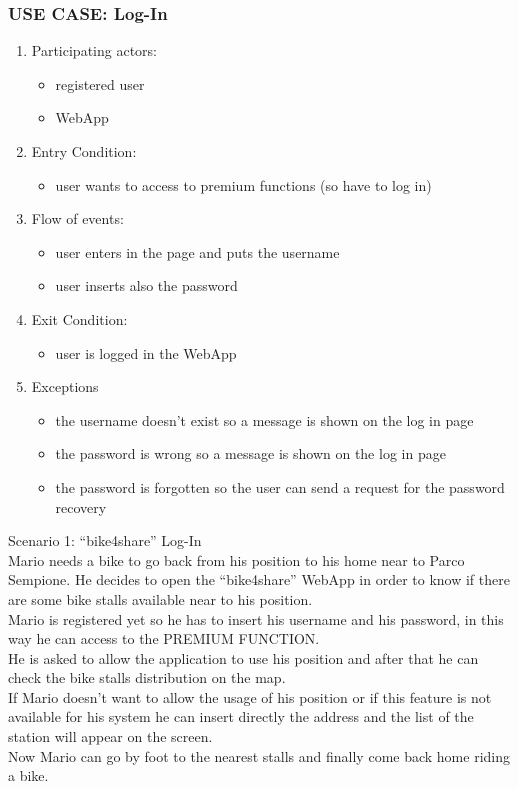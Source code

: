 \documentclass{article}
\begin{document}
\subsubsection{\textbf{USE CASE}: Log-In}
\begin{enumerate}
\item Participating actors: 
\begin{itemize}
    \item registered user
    \item WebApp
\end{itemize}
\item Entry Condition: 
\begin{itemize}
    \item user wants to access to premium functions (so have to log in)
\end{itemize}
\item Flow of events: 
\begin{itemize}
    \item user enters in the page and puts the username
    \item user inserts also the password
\end{itemize}
\item Exit Condition: 
\begin{itemize}
    \item user is logged in the WebApp
\end{itemize}
\item Exceptions
\begin{itemize}
    \item the username doesn’t exist so a message is shown on the log in page
    \item the password is wrong so a message is shown on the log in page
    \item the password is forgotten so the user can send a request for the password recovery
\end{itemize}
\end{enumerate}

Scenario 1: “bike4share” Log-In \\
Mario needs a bike to go back from his position to his home near to Parco Sempione. He decides to open the “bike4share” WebApp in order to know if there are some bike stalls available near to his position.\\ 
Mario is registered yet so he has to insert his username and his password, in this way he can access to the PREMIUM FUNCTION.\\ 
He is asked to allow the application to use his position and after that he can check the bike stalls distribution on the map. \\
If Mario doesn’t want to allow the usage of his position or if this feature is not available for his system he can insert directly the address and the list of the station will appear on the screen.\\ Now Mario can go by foot to the nearest stalls and finally come back home riding a bike.
\end{document}
